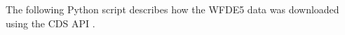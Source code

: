 
\label{sec:download_wfde5}

The following Python script describes how the WFDE5 data was downloaded using the CDS API \autocite{cucchiWFDE5BiasadjustedERA52020}. 

